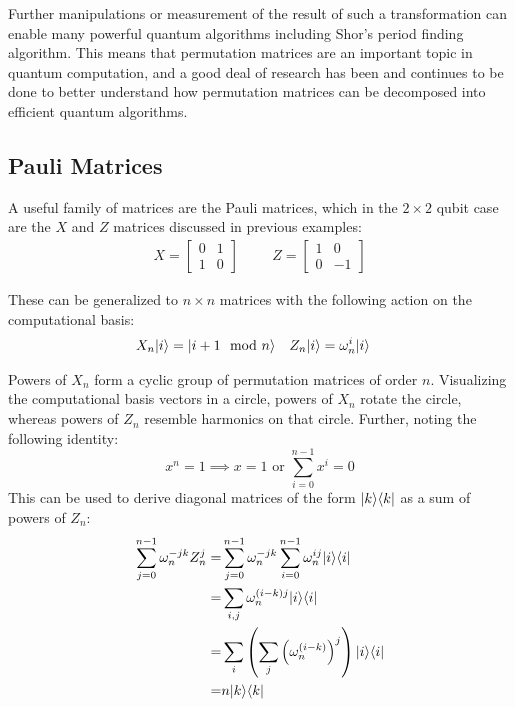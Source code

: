 Further manipulations or measurement of the result of such a transformation can enable many powerful quantum algorithms including Shor's period finding algorithm. This means that permutation matrices are an important topic in quantum computation, and a good deal of research has been and continues to be done to better understand how permutation matrices can be decomposed into efficient quantum algorithms.

\subsection{Pauli Matrices}

A useful family of matrices are the Pauli matrices, which in the $2\times2$ qubit case are the $X$ and $Z$ matrices discussed in previous examples:
\begin{align*}
X = \left[\begin{matrix}
0&1\\
1&0
\end{matrix}\right]
&&&
Z = \left[\begin{matrix}
1&0\\
0&-1
\end{matrix}\right]
\end{align*}

These can be generalized to $n\times n$ matrices with the following action on the computational basis:
\begin{align*}
X_n| i \rangle = | i+1\mod n \rangle
&&&
Z_n| i \rangle = \omega_n^i| i \rangle
\end{align*}

Powers of $X_n$ form a cyclic group of permutation matrices of order $n$. Visualizing the computational basis vectors in a circle, powers of $X_n$ rotate the circle, whereas powers of $Z_n$ resemble harmonics on that circle. Further, noting the following identity:
\[x^n=1 \implies x = 1 \text{\ or\ } \sum_{i=0}^{n-1}x^i = 0\]
This can be used to derive diagonal matrices of the form $| k \rangle\langle k |$ as a sum of powers of $Z_n$:
\begin{align*}
\sum_{j=0}^{n-1} \omega_n^{-jk}Z_n^j
=& \sum_{j=0}^{n-1}\omega_n^{-jk} \sum_{i=0}^{n-1}\omega_n^{ij}| i \rangle\langle i |
\\=& \sum_{i,j} \omega_n^{(i-k)j}| i \rangle\langle i |
\\=& \sum_{i} \left(\sum_j \left(\omega_n^{(i-k)}\right)^j\right)| i \rangle\langle i |
\\=& n| k \rangle\langle k |
\end{align*}

